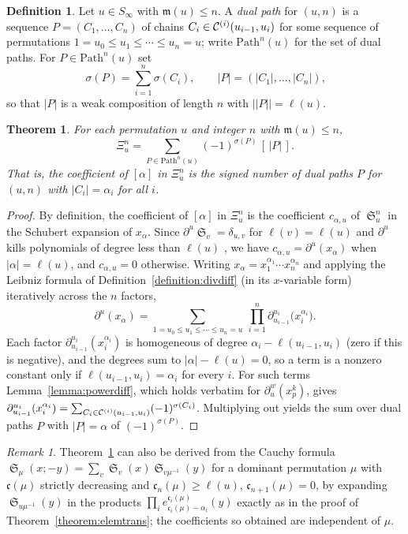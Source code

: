 \documentclass{amsart}
\newtheorem{theorem}{Theorem}[section]
\theoremstyle{definition}
\newtheorem{definition}[lemma]{Definition}
\theoremstyle{remark}
\newtheorem*{remark}{Remark}
\numberwithin{equation}{subsection}
\DeclareMathOperator{\sch}{\mathfrak{S}}
\newcommand{\dsch}{\ensuremath{\Xi}}
\newcommand{\code}{\mathfrak{c}}
\newcommand{\maxd}{\mathfrak{m}}
\begin{document}
\begin{definition}\label{definition:dualpath}
Let $u\in S_\infty$ with $\maxd(u)\leq n$. A \emph{dual path} for $(u,n)$ is a sequence $P=(C_1,\ldots,C_n)$ of chains $C_i\in\mathcal{C}^{(i)}(u_{i-1},u_i)$ for some sequence of permutations $1=u_0\leq u_1\leq\cdots\leq u_n=u$; write $\mathrm{Path}^n(u)$ for the set of dual paths. For $P\in\mathrm{Path}^n(u)$ set
$$\sigma(P)=\sum_{i=1}^n\sigma(C_i),\qquad |P|=(|C_1|,\ldots,|C_n|)\text{,}$$
so that $|P|$ is a weak composition of length $n$ with $\bigl||P|\bigr|=\ell(u)$.
\end{definition}

\begin{theorem}\label{theorem:dualformula}
	For each permutation $u$ and integer $n$ with $\maxd(u)\leq n$,
	$$\dsch_u^{n} = \sum_{P\in\mathrm{Path}^n(u)} (-1)^{\sigma(P)}\,[\,|P|\,]\text{.}$$
	That is, the coefficient of $[\alpha]$ in $\dsch_u^n$ is the signed number of dual paths $P$ for $(u,n)$ with $|C_i|=\alpha_i$ for all $i$.
\end{theorem}
\begin{proof}
	By definition, the coefficient of $[\alpha]$ in $\dsch_u^n$ is the coefficient $c_{\alpha,u}$ of $\sch_u^n$ in the Schubert expansion of $x_\alpha$. Since $\partial^u\sch_v=\delta_{u,v}$ for $\ell(v)=\ell(u)$ and $\partial^u$ kills polynomials of degree less than $\ell(u)$ \cite{notes}, we have $c_{\alpha,u}=\partial^u(x_\alpha)$ when $|\alpha|=\ell(u)$, and $c_{\alpha,u}=0$ otherwise. Writing $x_\alpha=x_1^{\alpha_1}\cdots x_n^{\alpha_n}$ and applying the Leibniz formula of Definition~\ref{definition:divdiff} (in its $x$-variable form) iteratively across the $n$ factors,
	$$\partial^u(x_\alpha)=\sum_{1=u_0\leq u_1\leq\cdots\leq u_n=u}\ \prod_{i=1}^n\partial_{u_{i-1}}^{u_i}\bigl(x_i^{\alpha_i}\bigr)\text{.}$$
	Each factor $\partial_{u_{i-1}}^{u_i}(x_i^{\alpha_i})$ is homogeneous of degree $\alpha_i-\ell(u_{i-1},u_i)$ (zero if this is negative), and the degrees sum to $|\alpha|-\ell(u)=0$, so a term is a nonzero constant only if $\ell(u_{i-1},u_i)=\alpha_i$ for every $i$. For such terms Lemma~\ref{lemma:powerdiff}, which holds verbatim for $\partial_u^w(x_p^k)$, gives $\partial_{u_{i-1}}^{u_i}(x_i^{\alpha_i})=\sum_{C_i\in\mathcal{C}^{(i)}(u_{i-1},u_i)}(-1)^{\sigma(C_i)}$. Multiplying out yields the sum over dual paths $P$ with $|P|=\alpha$ of $(-1)^{\sigma(P)}$.
\end{proof}

\begin{remark}
Theorem~\ref{theorem:dualformula} can also be derived from the Cauchy formula $\sch_\mu(x;-y)=\sum_{v}\sch_v(x)\sch_{v\mu^{-1}}(y)$ for a dominant permutation $\mu$ with $\code(\mu)$ strictly decreasing and $\code_n(\mu)\geq\ell(u)$, $\code_{n+1}(\mu)=0$, by expanding $\sch_{u\mu^{-1}}(y)$ in the products $\prod_i e^{\code_i(\mu)}_{\code_i(\mu)-\alpha_i}(y)$ exactly as in the proof of Theorem~\ref{theorem:elemtrans}; the coefficients so obtained are independent of $\mu$.
\end{remark}
\end{document}
